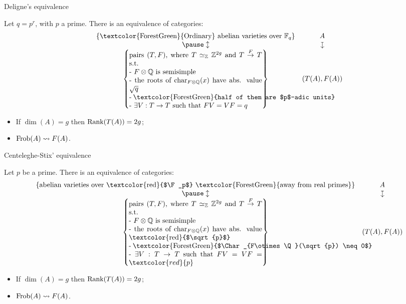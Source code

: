 \documentclass[usenames,dvipsnames]{beamer}
\newcommand{\red}[1]{\textcolor{red}{#1}}
\newcommand{\green}[1]{\textcolor{ForestGreen}{#1}}
\begin{document}
\begin{frame}{ Deligne's equivalence }
\begin{theorem}[Deligne '69]
Let $q=p^r$, with $p$ a prime. There is an equivalence of categories:
\[\begin{array}{cc}
\set{\text{\green{Ordinary} abelian varieties over $\F_q$}}	& A \\
\pause \updownarrow							& \downmapsto \\
\set{\parbox[p]{19em}{pairs $(T,F)$, where $T\simeq_\Z \Z^{2g}$ and $T\overset{F}{\to} T$ s.t.\\
- $F\otimes \Q$ is semisimple\\
- the roots of $\Char_{F\otimes\Q}(x)$ have abs. value $\sqrt{q}$\\
- \green{half of them are $p$-adic units}\\
- $\exists V:T\to T$ such that $FV=VF=q$
}}	& (T(A),F(A))
\end{array}\]
\end{theorem}
\pause
\begin{remark}
\begin{itemize}
 \item If $\dim(A)=g$ then $\operatorname{Rank}(T(A))=2g$;
 \item $\operatorname{Frob}(A)\rightsquigarrow F(A)$.
\end{itemize}
\end{remark}
\end{frame}

\begin{frame}{ Centeleghe-Stix' equivalence }
\begin{theorem}
Let $p$ be a prime. There is an equivalence of categories:
\[\begin{array}{cc}
\set{\text{abelian varieties over \red{$\F_p$} \green{away from real primes}}}	& A \\
\pause \updownarrow							& \downmapsto \\
\set{\parbox[p]{19em}{pairs $(T,F)$, where $T\simeq_\Z \Z^{2g}$ and $T\overset{F}{\to} T$ s.t.\\
- $F\otimes \Q$ is semisimple\\
- the roots of $\Char_{F\otimes\Q}(x)$ have abs. value \red{$\sqrt{p}$}\\
- \green{$\Char_{F\otimes\Q}(\sqrt{p}) \neq 0$}\\
- $\exists V:T\to T$ such that $FV=VF=\red{p}$
}}	& (T(A),F(A))
\end{array}\]
\end{theorem}
\pause
\begin{remark}
\begin{itemize}
 \item If $\dim(A)=g$ then $\operatorname{Rank}(T(A))=2g$;
 \item $\operatorname{Frob}(A)\rightsquigarrow F(A)$.
\end{itemize}
\end{remark}
\end{frame}
\end{document}
